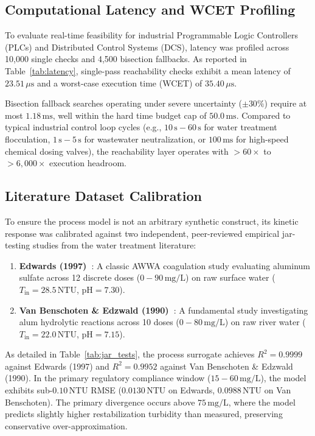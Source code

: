 \documentclass[10pt,twocolumn,letterpaper]{article}
\theoremstyle{definition}
\newcommand{\Tin}{T_{\text{in}}}
\begin{document}
\subsection{Computational Latency and WCET Profiling}
To evaluate real-time feasibility for industrial Programmable Logic Controllers (PLCs) and Distributed Control Systems (DCS), latency was profiled across 10,000 single checks and 4,500 bisection fallbacks. As reported in Table~\ref{tab:latency}, single-pass reachability checks exhibit a mean latency of $23.51\,\mu\text{s}$ and a worst-case execution time (WCET) of $35.40\,\mu\text{s}$. 

Bisection fallback searches operating under severe uncertainty ($\pm 30\%$) require at most $1.18\,\text{ms}$, well within the hard time budget cap of $50.0\,\text{ms}$. Compared to typical industrial control loop cycles (e.g., $10\,\text{s} - 60\,\text{s}$ for water treatment flocculation, $1\,\text{s} - 5\,\text{s}$ for wastewater neutralization, or $100\,\text{ms}$ for high-speed chemical dosing valves), the reachability layer operates with $>60\times$ to $>6{,}000\times$ execution headroom.

\subsection{Literature Dataset Calibration}
To ensure the process model is not an arbitrary synthetic construct, its kinetic response was calibrated against two independent, peer-reviewed empirical jar-testing studies from the water treatment literature:
\begin{enumerate}
    \item \textbf{Edwards (1997)~\cite{edwards1997predicting}}: A classic AWWA coagulation study evaluating aluminum sulfate across 12 discrete doses ($0 - 90\,\text{mg/L}$) on raw surface water ($\Tin = 28.5\,\text{NTU}$, $\text{pH} = 7.30$).
    \item \textbf{Van Benschoten \& Edzwald (1990)~\cite{vanbenschoten1990chemical}}: A fundamental study investigating alum hydrolytic reactions across 10 doses ($0 - 80\,\text{mg/L}$) on raw river water ($\Tin = 22.0\,\text{NTU}$, $\text{pH} = 7.15$).
\end{enumerate}
As detailed in Table~\ref{tab:jar_tests}, the process surrogate achieves $R^2 = 0.9999$ against Edwards (1997) and $R^2 = 0.9952$ against Van Benschoten \& Edzwald (1990). In the primary regulatory compliance window ($15 - 60\,\text{mg/L}$), the model exhibits sub-$0.10\,\text{NTU}$ RMSE ($0.0130\,\text{NTU}$ on Edwards, $0.0988\,\text{NTU}$ on Van Benschoten). The primary divergence occurs above $75\,\text{mg/L}$, where the model predicts slightly higher restabilization turbidity than measured, preserving conservative over-approximation.
\end{document}
